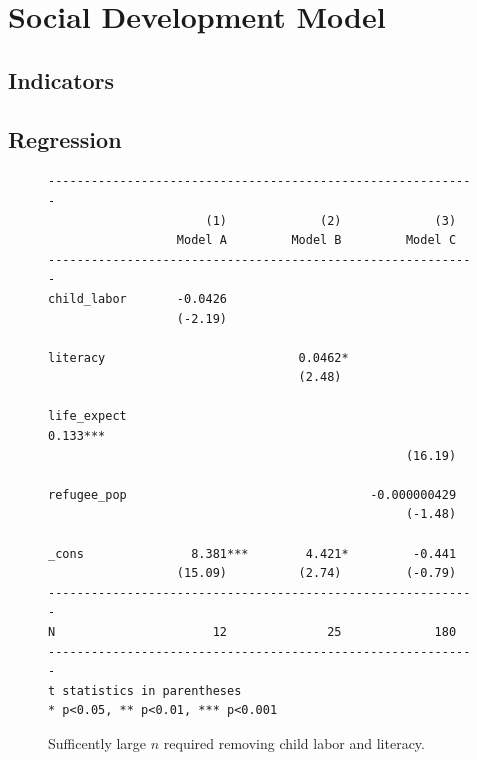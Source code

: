 \documentclass[12pt]{article}
\begin{document}
\section{Social Development Model}

\subsection{Indicators}

\subsection{Regression}

\begin{figure}[h!]
\begin{singlespace}
\small
\begin{verbatim}
------------------------------------------------------------
                      (1)             (2)             (3)
                  Model A         Model B         Model C
------------------------------------------------------------
child_labor       -0.0426
                  (-2.19)

literacy                           0.0462*
                                   (2.48)

life_expect                                         0.133***
                                                  (16.19)

refugee_pop                                  -0.000000429
                                                  (-1.48)

_cons               8.381***        4.421*         -0.441
                  (15.09)          (2.74)         (-0.79)
------------------------------------------------------------
N                      12              25             180
------------------------------------------------------------
t statistics in parentheses
* p<0.05, ** p<0.01, *** p<0.001
\end{verbatim}
\end{singlespace}
\caption{\label{social_development_model_regressions}Sufficently large $n$ required removing child labor and literacy.}
\end{figure}
\end{document}
